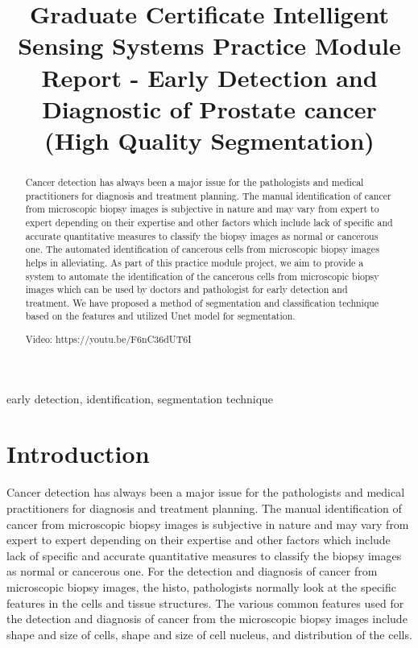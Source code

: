 \documentclass{article}
\title{Graduate Certificate Intelligent Sensing Systems Practice Module Report - Early Detection and Diagnostic of Prostate cancer​ (High Quality Segmentation)}
\begin{document}
%
\maketitle
%

\begin{abstract}

Cancer detection has always been a major issue for the pathologists and medical practitioners for diagnosis and treatment planning. The manual identification of cancer from microscopic biopsy images is subjective in nature and may vary from expert to expert depending on their expertise and other factors which include lack of specific and accurate quantitative measures to classify the biopsy images as normal or cancerous one. The automated identification of cancerous cells from microscopic biopsy images helps in alleviating. As part of this practice module project, we aim to provide a system to automate the identification of the cancerous cells from microscopic biopsy images which can be used by doctors and pathologist for early detection and treatment. We have proposed a method of segmentation and classification technique based on the features and utilized Unet model for segmentation.

Video: https://youtu.be/F6nC36dUT6I

\end{abstract}
%
\begin{keywords}
early detection, identification, segmentation technique 
\end{keywords}
%
\section{Introduction}
\label{sec:intro}

Cancer detection has always been a major issue for the pathologists and medical practitioners for diagnosis and treatment planning. The manual identification of cancer from microscopic biopsy images is subjective in nature and may vary from expert to expert depending on their expertise and other factors which include lack of specific and accurate quantitative measures to classify the biopsy images as normal or cancerous one. For the detection and diagnosis of cancer from microscopic biopsy images, the histo, pathologists normally look at the specific features in the cells and tissue structures. The various common features used for the detection and diagnosis of cancer from the microscopic biopsy images include shape and size of cells, shape and size of cell nucleus, and distribution of the cells.
\end{document}
